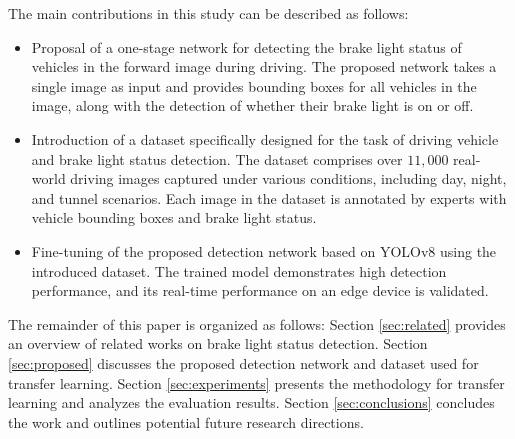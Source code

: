 The main contributions in this study can be described as follows:
\begin{itemize}
    \item Proposal of a one-stage network for detecting the brake light status of vehicles in the forward image during driving. The proposed network takes a single image as input and provides bounding boxes for all vehicles in the image, along with the detection of whether their brake light is on or off. 
    \item Introduction of a dataset specifically designed for the task of driving vehicle and brake light status detection. The dataset comprises over $11,000$ real-world driving images captured under various conditions, including day, night, and tunnel scenarios. Each image in the dataset is annotated by experts with vehicle bounding boxes and brake light status.
    \item Fine-tuning of the proposed detection network based on YOLOv8 using the introduced dataset. The trained model demonstrates high detection performance, and its real-time performance on an edge device is validated.
\end{itemize}

The remainder of this paper is organized as follows:
Section \ref{sec:related} provides an overview of related works on brake light status detection. 
Section \ref{sec:proposed} discusses the proposed detection network and dataset used for transfer learning.
Section \ref{sec:experiments} presents the methodology for transfer learning and analyzes the evaluation results.
Section \ref{sec:conclusions} concludes the work and outlines potential future research directions. 